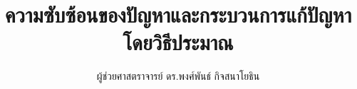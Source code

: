 \documentclass[12pt]{book}
\begin{document}
\title{\textbf{ความซับซ้อนของปัญหาและกระบวนการแก้ปัญหาโดยวิธีประมาณ}}
\author{ผู้ช่วยศาสตราจารย์ ดร.พงศ์พันธ์ กิจสนาโยธิน}


%
%
\end{document}
